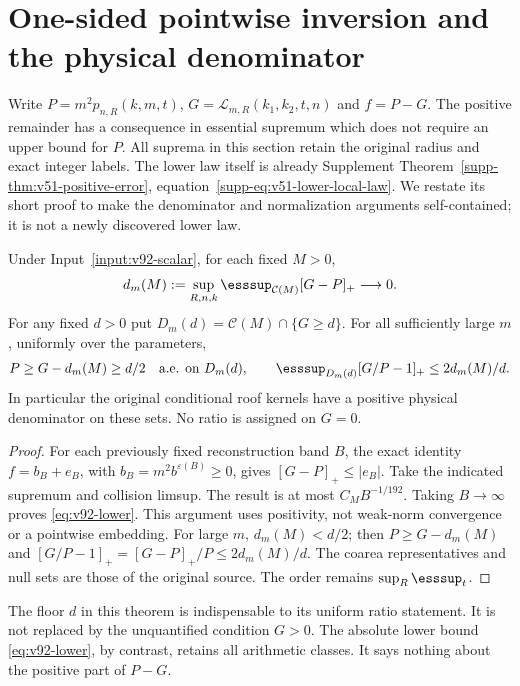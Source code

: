 \section{One-sided pointwise inversion and the physical denominator}
\label{sec:v92-lower}
Write $P=m^2p_{n,R}(k,m,t)$, $G=\mathcal L_{m,R}(k_1,k_2,t,n)$
and $f=P-G$. The positive remainder has a consequence in essential
supremum which does not require an upper bound for $P$. All suprema
in this section retain the original radius and exact integer labels.
The lower law itself is already Supplement
Theorem~\ref{supp-thm:v51-positive-error}, equation~\eqref{supp-eq:v51-lower-local-law}.
We restate its short proof to make the denominator and normalization
arguments self-contained; it is not a newly discovered lower law.

\begin{theorem}
\label{thm:v92-lower}
Under Input~\ref{input:v92-scalar}, for each fixed $M>0$,
\begin{equation}\label{eq:v92-lower}
 d_m(M):=\sup_{R,n,k}\esssup_{\mathcal C(M)}[G-P]_+
                                             \longrightarrow0.
\end{equation}
For any fixed $d>0$ put $D_m(d)=\mathcal C(M)\cap\{G\ge d\}$.
For all sufficiently large $m$, uniformly over the parameters,
\begin{equation}\label{eq:v92-denominator}
 P\ge G-d_m(M)\ge d/2\quad\hbox{a.e. on }D_m(d),\qquad
 \esssup_{D_m(d)}[G/P-1]_+\le 2d_m(M)/d.
\end{equation}
In particular the original conditional roof kernels have a positive
physical denominator on these sets. No ratio is assigned on $G=0$.
\end{theorem}
\begin{proof}
For each previously fixed reconstruction band $B$, the exact identity
$f=b_B+e_B$, with $b_B=m^2b^{\varepsilon(B)}\ge0$, gives
$[G-P]_+\le |e_B|$. Take the indicated supremum and collision limsup.
The result is at most $C_MB^{-1/192}$. Taking $B\to\infty$ proves
\eqref{eq:v92-lower}. This argument uses positivity, not weak-norm
convergence or a pointwise embedding. For large $m$, $d_m(M)<d/2$;
then $P\ge G-d_m(M)$ and
$[G/P-1]_+=[G-P]_+/P\le2d_m(M)/d$.
The coarea representatives and null sets are those of the original
source. The order remains $\sup_R\esssup_t$.
\end{proof}

The floor $d$ in this theorem is indispensable to its uniform ratio
statement. It is not replaced by the unquantified condition $G>0$.
The absolute lower bound \eqref{eq:v92-lower}, by contrast, retains
all arithmetic classes. It says nothing about the positive part of
$P-G$.

